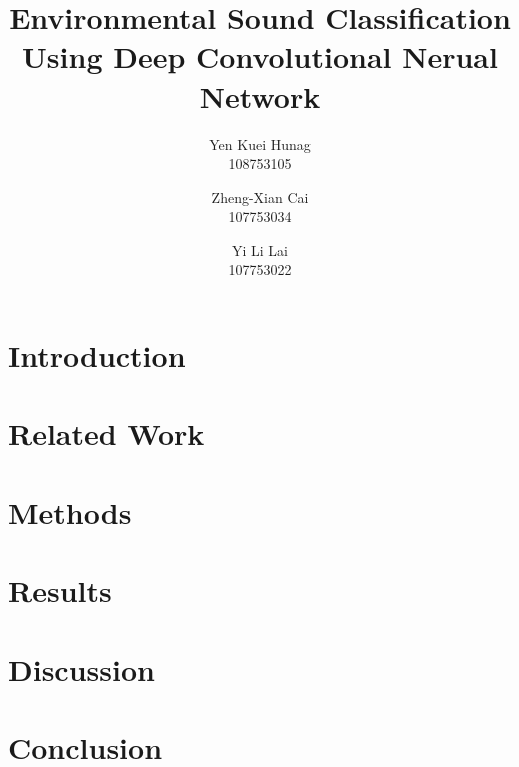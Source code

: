 \documentclass[11pt,oneside,a4paper]{article}
\title{ \LARGE \bf
Environmental Sound Classification Using Deep Convolutional Nerual Network
}
\author{Yen Kuei Hunag \\ 108753105 \and  Zheng-Xian Cai \\ 107753034 \and Yi Li Lai \\ 107753022}
\date{\vspace{-5ex}}
\begin{document}
\maketitle

\begin{abstract}
    
\end{abstract}


\section{Introduction}
    

\section{Related Work}
    

\section{Methods}
    

\section{Results}
    

\section{Discussion}
    

\section{Conclusion}
    

{}

\nocite{*}
\end{document}
